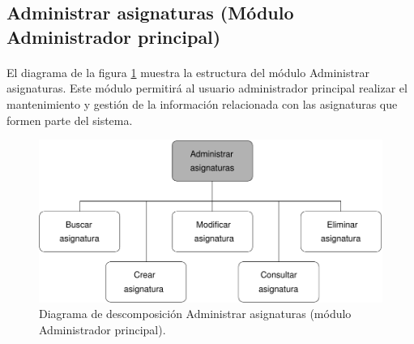 \subsection{Administrar asignaturas (Módulo Administrador principal)}

  \paragraph{}El diagrama de la figura
  \ref{diagramaDescomposicionAdministrarAsignaturas} muestra la estructura del
  módulo Administrar asignaturas. Este módulo permitirá al usuario
  administrador principal realizar el mantenimiento y gestión de la información
  relacionada con las asignaturas que formen parte del sistema.


  \begin{figure}[!ht]
    \begin{center}
      \includegraphics[]{11.Disenyo_Arquitectonico/11.2.Diagramas_Descomposicion/11.2.2.Modulo_administrador_principal/AdministrarBBDD/AdministrarAsignaturas/Diagramas/administrar_asignaturas.pdf}
      \caption{Diagrama de descomposición Administrar asignaturas (módulo Administrador principal).}
      \label{diagramaDescomposicionAdministrarAsignaturas}
    \end{center}
  \end{figure}
